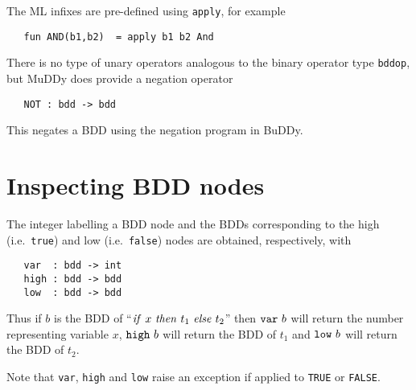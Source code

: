 \documentclass[12pt]{article}
\newcommand{\bnind}[1]{\index[MLbn]{#1}}
\renewcommand{\t}[1]{\mbox{\tt #1}}
\newcommand{\ty}[1]{\mbox{\tt #1}}
\newcommand{\ml}[1]{{\tt #1}}
\newcommand{\Buddy}{BuDDy\xspace}
\newcommand{\Muddy}{MuDDy\xspace}
\newcommand\fun{\mbox{\tt{->}}}
\renewcommand{\prod}{\mbox{\tt{*}}}
\begin{document}
The ML infixes are pre-defined using \t{apply}, for example
\begin{verbatim}
   fun AND(b1,b2)  = apply b1 b2 And
\end{verbatim}

There is no type of unary operators analogous to the binary operator
type \t{bddop}, but \Muddy{} does provide a negation operator

%
%

\begin{verbatim}
   NOT : bdd -> bdd
\end{verbatim}\bnind{\ml{NOT}}

This negates a BDD using the negation program in \Buddy.



\section{Inspecting BDD nodes}

The integer labelling a BDD node and the BDDs corresponding to the high
(i.e.~{\t{true}}) and low (i.e.~{\t{false}}) nodes are obtained,
respectively, with

%
%

\begin{verbatim}
   var  : bdd -> int
   high : bdd -> bdd
   low  : bdd -> bdd
\end{verbatim}\bnind{\ml{var}}\bnind{\ml{high}}\bnind{\ml{low}}

Thus if $b$ is the BDD of ``${\it{if}}~x~{\it{then}}~t_1~{\it{else}}~t_2$''
then $\t{var}~b$ will return the number representing variable $x$,
$\t{high}~b$ will return the BDD of $t_1$ and $\t{low}~b$ will return
the BDD of $t_2$.

Note that \t{var}, \t{high} and \t{low} raise an exception if applied
to \t{TRUE} or \t{FALSE}.
\end{document}
